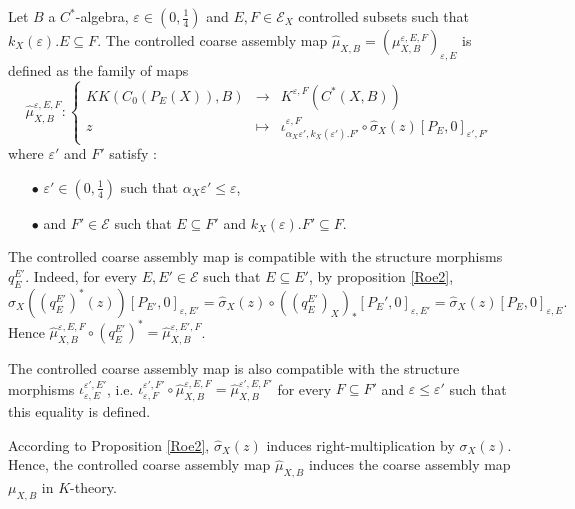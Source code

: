 \begin{definition}
Let $B$ a $C^*$-algebra, $\varepsilon\in (0,\frac{1}{4})$ and $E,F\in\mathcal E_X$ controlled subsets such that $k_X(\varepsilon).E\subseteq F$. The controlled coarse assembly map $\hat\mu_{X,B}=(\mu_{X,B}^{\varepsilon,E,F})_{\varepsilon,E}$ is defined as the family of maps
\[\hat\mu_{X,B}^{\varepsilon, E,F} :\left\{\begin{array}{rcl} KK(C_0(P_E(X)),B) & \rightarrow & K^{\varepsilon, F}(C^*(X,B)) \\
					z & \mapsto & \iota_{\alpha_X \varepsilon',k_X(\varepsilon').F'}^{\varepsilon,F}\circ\hat\sigma_X(z)[P_{E},0]_{\varepsilon', F'}\end{array}\right.\]
where $\varepsilon'$ and $F'$ satisfy :
\begin{itemize}
\item[$\bullet$] $\varepsilon'\in (0,\frac{1}{4})$ such that $\alpha_X \varepsilon'\leq \varepsilon$,
\item[$\bullet$] and $F'\in\mathcal E$ such that $E\subseteq F'$ and $k_X(\varepsilon).F'\subseteq F$.
\end{itemize}
\end{definition}

\begin{rk} The controlled coarse assembly map is compatible with the structure morphisms $q_E^{E'}$. Indeed, for every $E,E'\in \mathcal E$ such that $E\subseteq E'$, by proposition \ref{Roe2}, 
\[\hat\sigma_X((q_E^{E'})^*(z))[P_{E'},0]_{\varepsilon,E'}  = \hat\sigma_X(z)\circ ((q_E^{E'})_X)_*[P_E',0]_{\varepsilon,E'}= \hat\sigma_X(z)[P_E,0]_{\varepsilon,E}.\] 
Hence $\hat\mu_{X,B}^{\varepsilon,E,F}\circ(q_E^{E'})^* =\hat\mu_{X,B}^{\varepsilon,E',F}$.
\end{rk}

\begin{rk} The controlled coarse assembly map is also compatible with the structure morphisms $\iota_{\varepsilon,E}^{\varepsilon',E'}$, i.e. $\iota_{\varepsilon,F}^{\varepsilon',F'}\circ\hat\mu_{X,B}^{\varepsilon,E,F} =\hat\mu_{X,B}^{\varepsilon',E,F'}$ for every $F\subseteq F'$ and $\varepsilon\leq \varepsilon'$ such that this equality is defined. 
\end{rk}

\begin{rk}According to Proposition \ref{Roe2}, $\hat\sigma_X(z)$ induces right-multiplication by $\sigma_X(z)$. Hence, the controlled coarse assembly map $\hat \mu_{X,B}$ induces the coarse assembly map $\mu_{X,B}$ in $K$-theory.
\end{rk}

